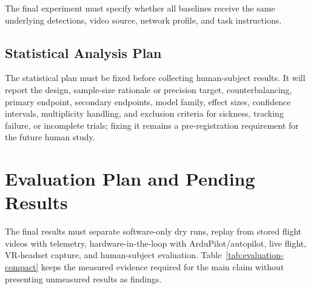 \documentclass[fleqn]{VRIH2025}
\begin{document}
The final experiment must specify whether all baselines receive the same underlying detections, video source, network profile, and task instructions.

\subsection{Statistical Analysis Plan}

The statistical plan must be fixed before collecting human-subject results. It will report the design, sample-size rationale or precision target, counterbalancing, primary endpoint, secondary endpoints, model family, effect sizes, confidence intervals, multiplicity handling, and exclusion criteria for sickness, tracking failure, or incomplete trials; fixing it remains a pre-registration requirement for the future human study.

\section{Evaluation Plan and Pending Results}

The final results must separate software-only dry runs, replay from stored flight videos with telemetry, hardware-in-the-loop with ArduPilot/autopilot, live flight, VR-headset capture, and human-subject evaluation. Table~\ref{tab:evaluation-compact} keeps the measured evidence required for the main claim without presenting unmeasured results as findings.
\end{document}
